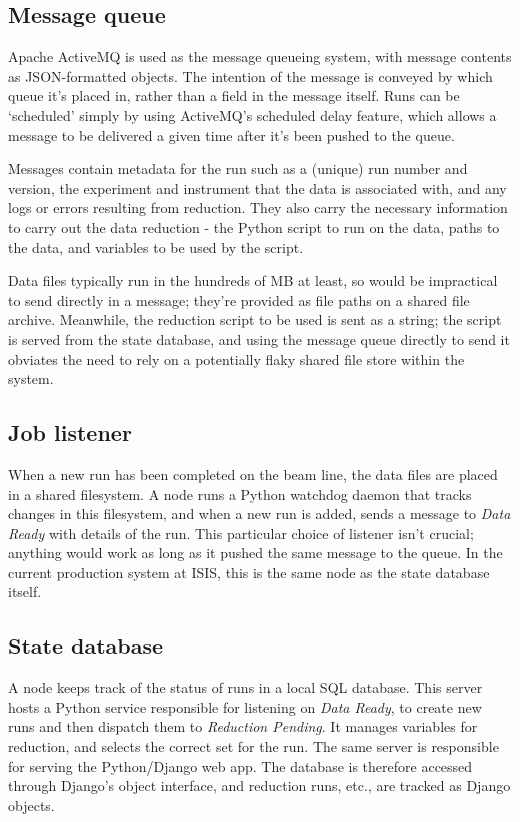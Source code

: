 \documentclass[twocolumn]{article}
\begin{document}
\subsection{Message queue}\label{message-queue}

Apache ActiveMQ\cite{activemq} is used as the message queueing system, with
message contents as JSON-formatted objects. The intention of the message
is conveyed by which queue it's placed in, rather than a field in the
message itself. Runs can be `scheduled' simply by using ActiveMQ's
scheduled delay feature, which allows a message to be delivered a given
time after it's been pushed to the queue.

Messages contain metadata for the run such as a (unique) run number and
version, the experiment and instrument that the data is associated with,
and any logs or errors resulting from reduction. They also carry the
necessary information to carry out the data reduction - the Python
script to run on the data, paths to the data, and variables to be used
by the script.

Data files typically run in the hundreds of MB at least, so would be
impractical to send directly in a message; they're provided as file
paths on a shared file archive. Meanwhile, the reduction script to be
used is sent as a string; the script is served from the state database,
and using the message queue directly to send it obviates the need to
rely on a potentially flaky shared file store within the system.

\subsection{Job listener}\label{job-listener}

When a new run has been completed on the beam line, the data files are
placed in a shared filesystem. A node runs a Python watchdog daemon that
tracks changes in this filesystem, and when a new run is added, sends a
message to \emph{Data Ready} with details of the run. This particular
choice of listener isn't crucial; anything would work as long as it
pushed the same message to the queue. In the current production system
at ISIS, this is the same node as the state database itself.

\subsection{State database}\label{state-database}

A node keeps track of the status of runs in a local SQL database. This
server hosts a Python service responsible for listening on \emph{Data
Ready}, to create new runs and then dispatch them to \emph{Reduction
Pending}. It manages variables for reduction, and selects the correct
set for the run. The same server is responsible for serving the
Python/Django\cite{django} web app. The database is therefore accessed through
Django's object interface, and reduction runs, etc., are tracked as
Django objects.
\end{document}
